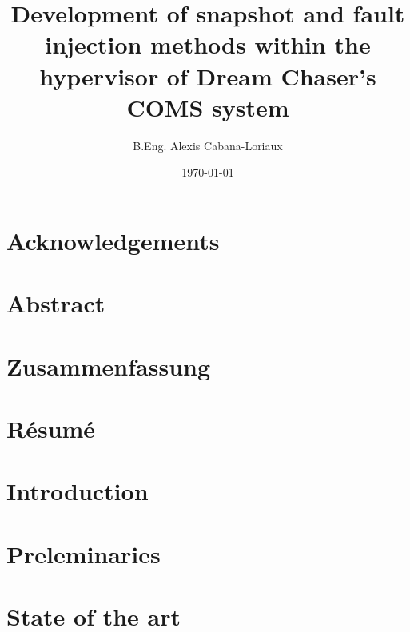 \documentclass[12pt,english]{rftthesis}
\title           {Development of snapshot and fault injection methods within the hypervisor of Dream Chaser's COMS system}
\author          {B.Eng. Alexis Cabana-Loriaux}
\date            {\today}
\begin{document}
\maketitle
\makedeclaration

\chapter*{Acknowledgements}

\chapter*{Abstract}\label{cha:abstract}

\chapter*{Zusammenfassung}\label{cha:zusammenfassung}

\chapter*{Résumé}\label{cha:resume}

\tableofcontents

\listoffigures

\listoftables

\printnoidxglossaries

\chapter{Introduction}

\chapter{Preleminaries}

\chapter{State of the art}

\end{document}
